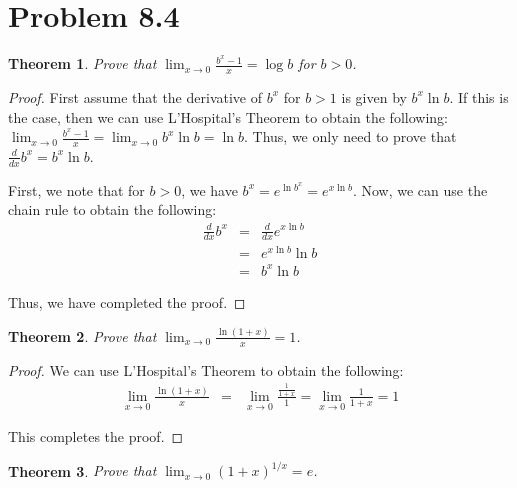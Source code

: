 \documentclass[psamsfonts]{amsart}
\newtheorem{thm}{Theorem}[section]
\theoremstyle{definition}
\theoremstyle{remark}
\numberwithin{equation}{section}
\begin{document}
\section{Problem 8.4}

\begin{thm}
Prove that $\lim_{x \to 0} \frac{b^x - 1}{x} = \log b$ for $b> 0$. 
\end{thm}

\begin{proof}
First assume that the derivative of $b^x$ for $b > 1$ is given by $b^x \ln b$. If this is the case, then we can use L'Hospital's Theorem to obtain the following: $\lim_{x \to 0} \frac{b^x - 1}{x} = \lim_{x \to 0} b^x \ln b = \ln b$. Thus, we only need to prove that $\frac{d}{dx} b^x = b^x \ln b$. 

First, we note that for $b>0$, we have $b^x = e^{\ln b^x} = e^{ x \ln b}$. Now, we can use the chain rule to obtain the following:
\begin{eqnarray}
\frac{d}{dx} b^x &=& \frac{d}{dx} e^{x \ln b} \\
&=& e^{x \ln b} \ln b  \\
&=& b^x \ln b
\end{eqnarray}

Thus, we have completed the proof.
\end{proof}

\begin{thm}
Prove that $\lim_{x \to 0} \frac{\ln(1+x)}{x} = 1$.
\end{thm}

\begin{proof}
We can use L'Hospital's Theorem to obtain the following:
\begin{eqnarray}
\lim_{x \to 0} \frac{\ln(1+x)}{x} &=& \lim_{x \to 0} \frac{ \frac{1}{1+x}}{1} = \lim_{x \to 0} \frac{1}{1+x} = 1
\end{eqnarray}

This completes the proof. 
\end{proof}

\begin{thm}
Prove that $\lim_{x \to 0} (1+x)^{1/x} = e$.
\end{thm}
\end{document}

